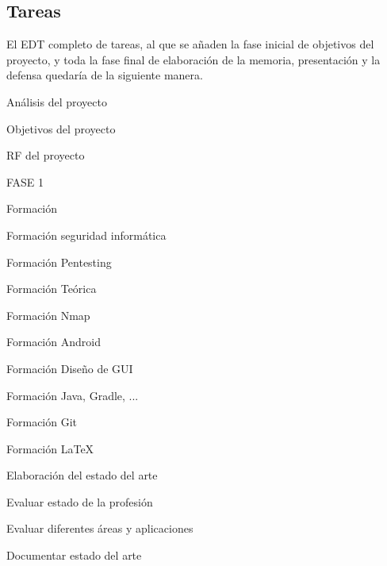 \subsection{Tareas}
El EDT completo de tareas, al que se añaden la fase inicial de objetivos del proyecto, y toda la fase final de elaboración de la memoria, presentación y la defensa quedaría de la siguiente manera.
\begin{numbered}
	\setcounter{numberedi}{-1} %
	
	\item Análisis del proyecto
	\begin{numbered}
		\item Objetivos del proyecto
		\item RF del proyecto
	\end{numbered}
	
	\item FASE 1
	\begin{numbered}
		
		\item Formación
		\begin{numbered}
			\item Formación seguridad informática
			\item Formación Pentesting
			\begin{numbered}
				\item Formación Teórica
				\item Formación Nmap
			\end{numbered}
			\item Formación Android
			\begin{numbered}
				\item Formación Diseño de GUI
				\item Formación Java, Gradle, ...
			\end{numbered}
			\item Formación Git
			\item Formación \LaTeX
		\end{numbered}
		
		\item Elaboración del estado del arte
		\begin{numbered}
			\item Evaluar estado de la profesión
			\item Evaluar diferentes áreas y aplicaciones
			\item Documentar estado del arte
		\end{numbered}
		

\end{numbered}
\end{numbered}

